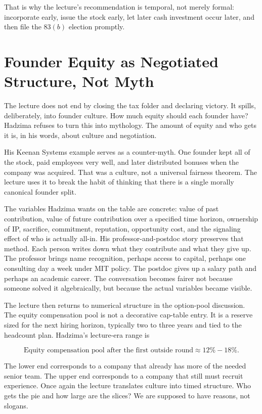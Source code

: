 That is why the lecture's recommendation is temporal, not merely formal: incorporate early, issue the stock early, let later cash investment occur later, and then file the \(83(b)\) election promptly.

\section{Founder Equity as Negotiated Structure, Not Myth}

The lecture does not end by closing the tax folder and declaring victory. It spills, deliberately, into founder culture. How much equity should each founder have? Hadzima refuses to turn this into mythology. The amount of equity and who gets it is, in his words, about culture and negotiation.

His Keenan Systems example serves as a counter-myth. One founder kept all of the stock, paid employees very well, and later distributed bonuses when the company was acquired. That was a culture, not a universal fairness theorem. The lecture uses it to break the habit of thinking that there is a single morally canonical founder split.

The variables Hadzima wants on the table are concrete: value of past contribution, value of future contribution over a specified time horizon, ownership of IP, sacrifice, commitment, reputation, opportunity cost, and the signaling effect of who is actually all-in. His professor-and-postdoc story preserves that method. Each person writes down what they contribute and what they give up. The professor brings name recognition, perhaps access to capital, perhaps one consulting day a week under MIT policy. The postdoc gives up a salary path and perhaps an academic career. The conversation becomes fairer not because someone solved it algebraically, but because the actual variables became visible.

The lecture then returns to numerical structure in the option-pool discussion. The equity compensation pool is not a decorative cap-table entry. It is a reserve sized for the next hiring horizon, typically two to three years and tied to the headcount plan. Hadzima's lecture-era range is

\begin{equation}
\text{Equity compensation pool after the first outside round}\approx 12\%-18\%.
\end{equation}

The lower end corresponds to a company that already has more of the needed senior team. The upper end corresponds to a company that still must recruit experience. Once again the lecture translates culture into timed structure. Who gets the pie and how large are the slices? We are supposed to have reasons, not slogans.

